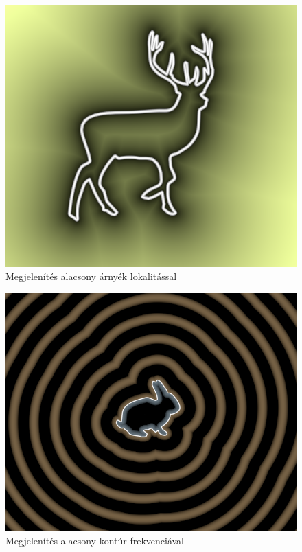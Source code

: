 \begin{figure}[H]
    \centering
    \includegraphics[width=0.78\linewidth]{images/low_shadow_locality.png}
    \caption{Megjelenítés alacsony árnyék lokalitással}
    \label{fig:low_shadow_locality-1}
\end{figure}

\begin{figure}[H]
    \centering
    \includegraphics[width=0.85\linewidth]{images/low_contour_frequency.png}
    \caption{Megjelenítés alacsony kontúr frekvenciával}
    \label{fig:low_contour_frequency-1}
\end{figure}

